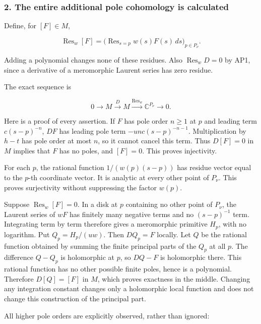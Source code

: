 \subsubsection{2. The entire additional pole cohomology is calculated}\label{endpoint-analytic_pole--the-entire-additional-pole-cohomology-is-calculated}

Define, for \([F]\in M\),

\[
\operatorname{Res}_w[F]
=\bigl(\operatorname{Res}_{s=p}w(s)F(s)\,ds\bigr)_{p\in P_\nu}.
\tag{AP2}
\]

Adding a polynomial changes none of these residues. Also \(\operatorname{Res}_w D=0\) by AP1, since a derivative of a meromorphic Laurent series has zero residue.

The exact sequence is

\[
0\longrightarrow M\xrightarrow{D}M
\xrightarrow{\operatorname{Res}_w}\mathbb C^{P_\nu}\longrightarrow0.
\tag{AP3}
\]

Here is a proof of every assertion. If \(F\) has pole order \(n\geq1\) at \(p\) and leading term \(c(s-p)^{-n}\), \(D F\) has leading pole term \(-u n c(s-p)^{-n-1}\). Multiplication by \(h-t\) has pole order at most \(n\), so it cannot cancel this term. Thus \(D[F]=0\) in \(M\) implies that \(F\) has no poles, and \([F]=0\). This proves injectivity.

For each \(p\), the rational function \(1/(w(p)(s-p))\) has residue vector equal to the \(p\)-th coordinate vector. It is analytic at every other point of \(P_{\nu}\). This proves surjectivity without suppressing the factor \(w(p)\).

Suppose \(\operatorname{Res}_w[F]=0\). In a disk at \(p\) containing no other point of \(P_{\nu}\), the Laurent series of \(wF\) has finitely many negative terms and no \((s-p)^{-1}\) term. Integrating term by term therefore gives a meromorphic primitive \(H_p\), with no logarithm. Put \(Q_p=H_p/(u w)\). Then \(D Q_p=F\) locally. Let \(Q\) be the rational function obtained by summing the finite principal parts of the \(Q_p\) at all \(p\). The difference \(Q-Q_p\) is holomorphic at \(p\), so \(DQ-F\) is holomorphic there. This rational function has no other possible finite poles, hence is a polynomial. Therefore \(D[Q]=[F]\) in \(M\), which proves exactness in the middle. Changing any integration constant changes only a holomorphic local function and does not change this construction of the principal part.

All higher pole orders are explicitly observed, rather than ignored:

